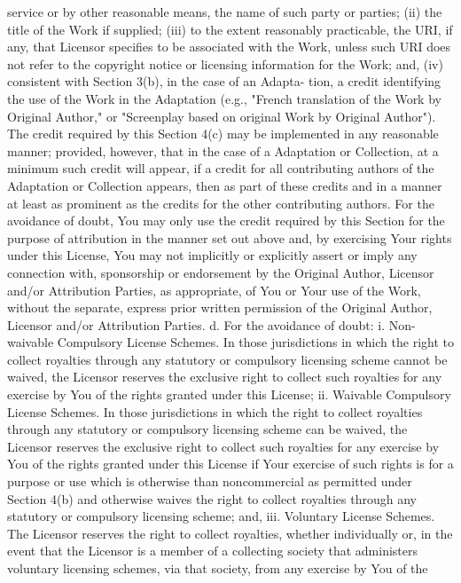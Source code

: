 \documentclass[oneside]{book}
\begin{document}
service or by other reasonable means, the name of such party or parties; (ii)
the title of the Work if supplied; (iii) to the extent reasonably practicable,
the URI, if any, that Licensor specifies to be associated with the Work, unless
such URI does not refer to the copyright notice or licensing information for the
Work; and, (iv) consistent with Section 3(b), in the case of an Adapta- tion, a
credit identifying the use of the Work in the Adaptation (e.g., "French
translation of the Work by Original Author," or "Screenplay based on original
Work by Original Author"). The credit required by this Section 4(c) may be
implemented in any reasonable manner; provided, however, that in the case of a
Adaptation or Collection, at a minimum such credit will appear, if a credit for
all contributing authors of the Adaptation or Collection appears, then as part
of these credits and in a manner at least as prominent as the credits for the
other contributing authors. For the avoidance of doubt, You may only use the
credit required by this Section for the purpose of attribution in the manner set
out above and, by exercising Your rights under this License, You may not
implicitly or explicitly assert or imply any connection with, sponsorship or
endorsement by the Original Author, Licensor and/or Attribution Parties, as
appropriate, of You or Your use of the Work, without the separate, express prior
written permission of the Original Author, Licensor and/or Attribution Parties.
d. For the avoidance of doubt: i. Non-waivable Compulsory License Schemes. In
those jurisdictions in which the right to collect royalties through any
statutory or compulsory licensing scheme cannot be waived, the Licensor reserves
the exclusive right to collect such royalties for any exercise by You of the
rights granted under this License; ii. Waivable Compulsory License Schemes. In
those jurisdictions in which the right to collect royalties through any
statutory or compulsory licensing scheme can be waived, the Licensor reserves
the exclusive right to collect such royalties for any exercise by You of the
rights granted under this License if Your exercise of such rights is for a
purpose or use which is otherwise than noncommercial as permitted under Section
4(b) and otherwise waives the right to collect royalties through any statutory
or compulsory licensing scheme; and, iii. Voluntary License Schemes. The
Licensor reserves the right to collect royalties, whether individually or, in
the event that the Licensor is a member of a collecting society that administers
voluntary licensing schemes, via that society, from any exercise by You of the
\end{document}
